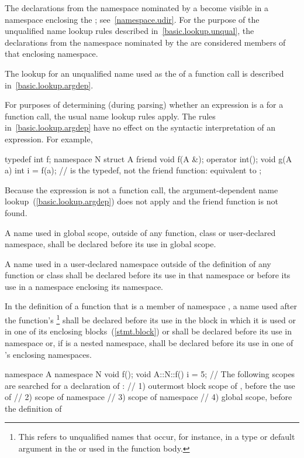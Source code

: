 \pnum
The declarations from the namespace nominated by a
 become visible in a namespace enclosing the
; see~\ref{namespace.udir}. For the purpose of
the unqualified name lookup rules described
in~\ref{basic.lookup.unqual}, the declarations from the namespace
nominated by the  are considered members of
that enclosing namespace.

\pnum
The lookup for an unqualified name used as the
 of a function call is described
in~\ref{basic.lookup.argdep}. \begin{note} For purposes of determining
(during parsing) whether an expression is a
 for a function call, the usual name lookup
rules apply. The rules in~\ref{basic.lookup.argdep} have no effect on
the syntactic interpretation of an expression. For example,

\begin{codeblock}
typedef int f;
namespace N {
  struct A {
    friend void f(A &);
    operator int();
    void g(A a) {
      int i = f(a);  //  is the typedef, not the friend function: equivalent to 
    }
  };
}
\end{codeblock}

Because the expression is not a function call, the argument-dependent
name lookup~(\ref{basic.lookup.argdep}) does not apply and the friend
function  is not found. \end{note}

\pnum
A name used in global scope, outside of any function, class or
user-declared namespace, shall be declared before its use in global
scope.

\pnum
A name used in a user-declared namespace outside of the definition of
any function or class shall be declared before its use in that namespace
or before its use in a namespace enclosing its namespace.

\pnum
In the definition of a function that is a member of namespace ,
a name used after the function's
\footnote{This refers to unqualified names
that occur, for instance, in
a type or default argument in the
 or used in the function body.}
shall be
declared before its use in the block in which it is used or in one of
its enclosing blocks~(\ref{stmt.block}) or shall be declared before its
use in namespace  or, if  is a nested namespace, shall
be declared before its use in one of 's enclosing namespaces.
\begin{example}

\begin{codeblock}
namespace A {
  namespace N {
    void f();
  }
}
void A::N::f() {
  i = 5;
  // The following scopes are searched for a declaration of :
  // 1) outermost block scope of , before the use of 
  // 2) scope of namespace 
  // 3) scope of namespace 
  // 4) global scope, before the definition of 
}
\end{codeblock}
\end{example}


